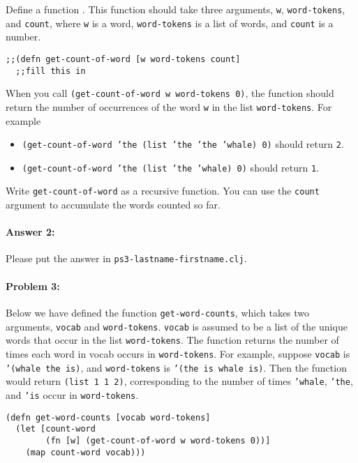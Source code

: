 \documentclass[10pt]{article}
\newcommand{\required}[1]{{\color{blue}{#1}}}
\newcommand{\PSnum}{3}
\begin{document}
Define a function \required{\texttt{get-count-of-word}}. This function should
take three arguments, \texttt{w}, \texttt{word-tokens}, and
\texttt{count}, where \texttt{w} is a word, \texttt{word-tokens} is a
list of words, and \texttt{count} is a number. 

\begin{lstlisting}
;;(defn get-count-of-word [w word-tokens count]
  ;;fill this in
\end{lstlisting}

When you call \texttt{(get-count-of-word w word-tokens 0)}, 
the function should return the number of occurrences of the
word \texttt{w} in the list \texttt{word-tokens}. For example
\begin{itemize}
\item
\texttt{(get-count-of-word 'the (list 'the 'the 'whale) 0)}
should return \texttt{2}.

\item
\texttt{(get-count-of-word 'the (list 'the 'whale) 0)}
should return \texttt{1}.
\end{itemize}
Write \texttt{get-count-of-word} as a recursive function.  
You can use the \texttt{count} argument to accumulate the words
counted so far.

\paragraph{Answer 2:} Please put the answer in
\texttt{ps\PSnum-lastname-firstname.clj}.

\noindent\hrulefill %

\paragraph{Problem 3:}

Below we have defined the function \texttt{get-word-counts}, which
takes two arguments, \texttt{vocab} and
\texttt{word-tokens}. \texttt{vocab} is assumed to be a list of the
unique words that occur in the list \texttt{word-tokens}. The function
returns the number of times each word in vocab occurs in
\texttt{word-tokens}. For example, suppose \texttt{vocab} is 
\texttt{'(whale the is)}, and \texttt{word-tokens} is 
\texttt{'(the is whale is)}. 
Then the function would return \texttt{(list 1 1 2)},
corresponding to the number of times \texttt{'whale},
\texttt{'the}, and \texttt{'is} occur in \texttt{word-tokens}.

\begin{lstlisting}
(defn get-word-counts [vocab word-tokens]
  (let [count-word 
        (fn [w] (get-count-of-word w word-tokens 0))]
    (map count-word vocab)))
\end{lstlisting}
\end{document}
